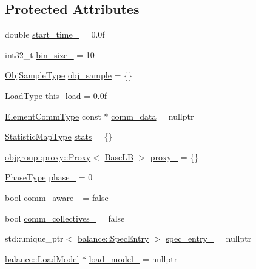 \subsection*{Protected Attributes}
\begin{DoxyCompactItemize}
\item 
double \hyperlink{structvt_1_1vrt_1_1collection_1_1lb_1_1_base_l_b_a457dff7a12e34494fa0537c78120eb41}{start\+\_\+time\+\_\+} = 0.\+0f
\item 
int32\+\_\+t \hyperlink{structvt_1_1vrt_1_1collection_1_1lb_1_1_base_l_b_a2623b9a1e60be9f6413d86fbff9e80bf}{bin\+\_\+size\+\_\+} = 10
\item 
\hyperlink{structvt_1_1vrt_1_1collection_1_1lb_1_1_base_l_b_a331d7da5bbf2883238427d86b54ddd7b}{Obj\+Sample\+Type} \hyperlink{structvt_1_1vrt_1_1collection_1_1lb_1_1_base_l_b_a82775a8f051e975a1a7f3046e7af61ac}{obj\+\_\+sample} = \{\}
\item 
\hyperlink{structvt_1_1vrt_1_1collection_1_1lb_1_1_base_l_b_a215e22b9f12678303f49615ae3be05cc}{Load\+Type} \hyperlink{structvt_1_1vrt_1_1collection_1_1lb_1_1_base_l_b_ab7df874591552c346fc77858983fbbec}{this\+\_\+load} = 0.\+0f
\item 
\hyperlink{structvt_1_1vrt_1_1collection_1_1lb_1_1_base_l_b_ac3f8560bfe41aa593eb7d5bd1241cc4c}{Element\+Comm\+Type} const  $\ast$ \hyperlink{structvt_1_1vrt_1_1collection_1_1lb_1_1_base_l_b_a8d519b94ce4741da7049cb2b7b513963}{comm\+\_\+data} = nullptr
\item 
\hyperlink{structvt_1_1vrt_1_1collection_1_1lb_1_1_base_l_b_a6e8dead5546b2054f604ca258e1e815e}{Statistic\+Map\+Type} \hyperlink{structvt_1_1vrt_1_1collection_1_1lb_1_1_base_l_b_a249359351566423733a7391dcdc2e203}{stats} = \{\}
\item 
\hyperlink{structvt_1_1objgroup_1_1proxy_1_1_proxy}{objgroup\+::proxy\+::\+Proxy}$<$ \hyperlink{structvt_1_1vrt_1_1collection_1_1lb_1_1_base_l_b}{Base\+LB} $>$ \hyperlink{structvt_1_1vrt_1_1collection_1_1lb_1_1_base_l_b_ab5cfe4d0cb73397c5ffe937f119bc71a}{proxy\+\_\+} = \{\}
\item 
\hyperlink{namespacevt_a46ce6733d5cdbd735d561b7b4029f6d7}{Phase\+Type} \hyperlink{structvt_1_1vrt_1_1collection_1_1lb_1_1_base_l_b_a9bb7a04d3ef1012c95322d8375593498}{phase\+\_\+} = 0
\item 
bool \hyperlink{structvt_1_1vrt_1_1collection_1_1lb_1_1_base_l_b_a0b7eb81cc499a7cd7c1a6fd1f6a3c8fe}{comm\+\_\+aware\+\_\+} = false
\item 
bool \hyperlink{structvt_1_1vrt_1_1collection_1_1lb_1_1_base_l_b_a1db6d0f8b8f62be357c7913930556d44}{comm\+\_\+collectives\+\_\+} = false
\item 
std\+::unique\+\_\+ptr$<$ \hyperlink{structvt_1_1vrt_1_1collection_1_1balance_1_1_spec_entry}{balance\+::\+Spec\+Entry} $>$ \hyperlink{structvt_1_1vrt_1_1collection_1_1lb_1_1_base_l_b_a20ee2c313345b2fe60de1141f69774bd}{spec\+\_\+entry\+\_\+} = nullptr
\item 
\hyperlink{classvt_1_1vrt_1_1collection_1_1balance_1_1_load_model}{balance\+::\+Load\+Model} $\ast$ \hyperlink{structvt_1_1vrt_1_1collection_1_1lb_1_1_base_l_b_ae6cd8bdf27d81dc55f9eec9038b347dc}{load\+\_\+model\+\_\+} = nullptr
\end{DoxyCompactItemize}
